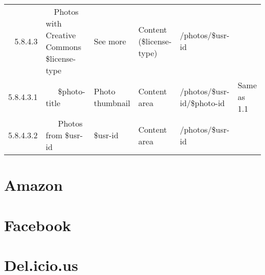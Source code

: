 \documentclass[12pt,a4paper]{article}
\begin{document}
\begin{landscape}
\begin{table}[h!b!p!]
\begin{center}
\begin{tiny}
\begin{tabular}{r|l|l|l|l|p{3cm}}
                    5.8.4.3 &
                    ~~Photos with Creative Commons \$license-type &
                    See more &
                    Content (\$license-type) &
                    /photos/\$usr-id &
                    \\

                      5.8.4.3.1 &
                      ~~~\$photo-title &
                      Photo thumbnail &
                      Content area &
                      /photos/\$usr-id/\$photo-id &
                      Same as 1.1 \\

                      5.8.4.3.2 &
                      ~~~Photos from \$usr-id &
                      \$usr-id &
                      Content area &
                      /photos/\$usr-id &
                      \\





          \end{tabular}
        \rm
      \end{tiny}
    \end{center}
  \end{table}
\end{landscape}

\section{Amazon}

\section{Facebook}

\section{Del.icio.us}
\end{document}
